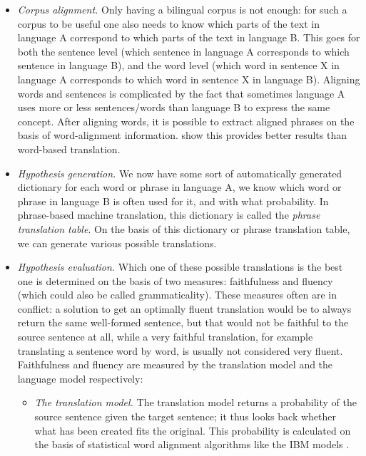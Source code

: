 \documentclass[12pt]{article}
\begin{document}
\begin{itemize}
\item \emph{Corpus alignment.} Only having a bilingual corpus is not enough: for such a corpus to be useful one also needs to know which parts of the text in language A correspond to which parts of the text in language B. This goes for both the sentence level (which sentence in language A corresponds to which sentence in language B), and the word level (which word in sentence X in language A corresponds to which word in sentence X in language B). Aligning words and sentences is complicated by the fact that sometimes language A uses more or less sentences/words than language B to express the same concept. After aligning words, it is possible to extract aligned phrases on the basis of word-alignment information. \citet{koehn03} show this provides better results than word-based translation.

\item \emph{Hypothesis generation.} We now have some sort of automatically generated dictionary for each word or phrase in language A, we know which word or phrase in language B is often used for it, and with what probability. In phrase-based machine translation, this dictionary is called the \emph{phrase translation table}. On the basis of this dictionary or phrase translation table, we can generate various possible translations. \\\indent

\item \emph{Hypothesis evaluation.} Which one of these possible translations is the best one is determined on the basis of two measures: faithfulness and fluency (which could also be called grammaticality). These measures often are in conflict: a solution to get an optimally fluent translation would be to always return the same well-formed sentence, but that would not be faithful to the source sentence at all, while a very faithful translation, for example translating a sentence word by word, is usually not considered very fluent. Faithfulness and fluency are measured by the translation model and the language model respectively:

\begin{itemize}
\item \emph{The translation model.} The translation model returns a probability of the source sentence given the target sentence; it thus looks back whether what has been created fits the original. This probability is calculated on the basis of statistical word alignment algorithms like the IBM models \citep{brown93}.


\end{itemize}
\end{itemize}
\end{document}
